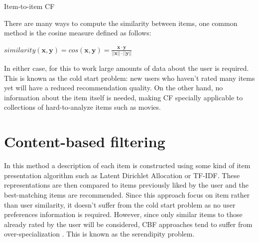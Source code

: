 \documentclass[cic,tc,english]{iiufrgs}
\begin{document}
\begin{algorithm}[H]
 \caption{Item-to-item CF}
\end{algorithm}

There are many ways to compute the similarity between items, one common method is the cosine measure defined as follows:

\(similarity(\pmb x, \pmb y) = cos(\pmb x, \pmb y) = \frac {\pmb x \cdot \pmb y}{||\pmb x|| \cdot ||\pmb y||}\)


In either case, for this to work large amounts of data about the user is required. This is known as the cold start problem: new users who haven't rated many items yet will have a reduced recommendation quality. On the other hand, no information about the item itself is needed, making CF specially applicable to collections of hard-to-analyze items such as movies.

\section{Content-based filtering}
In this method a description of each item is constructed using some kind of item presentation algorithm such as Latent Dirichlet Allocation or TF-IDF. These representations are then compared to items previously liked by the user and the best-matching items are recommended. Since this approach focus on item rather than user similarity, it doesn't suffer from the cold start problem as no user preferences information is required. However, since only similar items to those already rated by the user will be considered, CBF approaches tend to suffer from over-specialization \cite{Iaquinta2008}. This is known as the serendipity problem.
\end{document}
